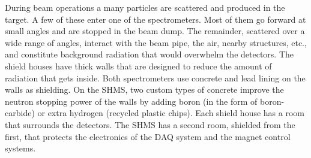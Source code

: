 During beam operations a many particles are scattered and
produced in the target. A few of these enter one of the spectrometers. Most of
them go forward at small angles and are stopped in the beam dump. The
remainder, scattered over a wide range of angles,  interact with the beam pipe,
the air, nearby structures, etc., and
constitute background radiation that would overwhelm the detectors.
The shield houses have thick walls that are designed to reduce the amount of
radiation that gets inside. Both spectrometers use
concrete and lead lining on the walls as shielding. On
the SHMS, two custom types of concrete improve the neutron stopping power
of the walls by
adding boron (in the form of boron-carbide) or extra hydrogen (recycled
plastic chips). Each shield house has a room that surrounds the detectors.
The SHMS has a second room, shielded from the first, that protects the
electronics of the DAQ system and the magnet control systems.

